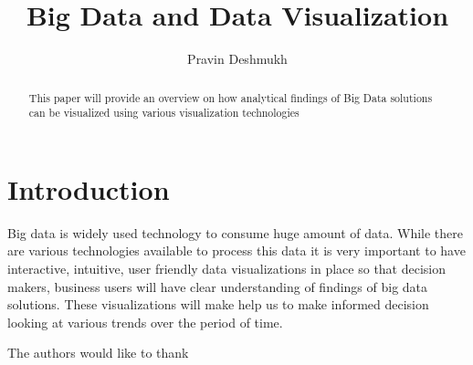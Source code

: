 \documentclass[sigconf]{acmart}
\begin{document}
\title{Big Data and Data Visualization}


\author{Pravin Deshmukh}

\renewcommand{\shortauthors}{Pravin Deshmukh}


\begin{abstract}
This paper will provide an overview on how analytical findings of Big Data solutions can be visualized using various visualization technologies 
\end{abstract}



\maketitle

\section{Introduction}

Big data is widely used technology to consume huge amount of data. While there are various technologies available to process this data it is very important to have interactive, intuitive, user friendly data visualizations in place so that decision makers, business users will have clear understanding of findings of big data solutions. These visualizations will make help us to make informed decision looking at various trends over the period of time. 


\begin{acks}

  The authors would like to thank 

\end{acks}


 
\end{document}
